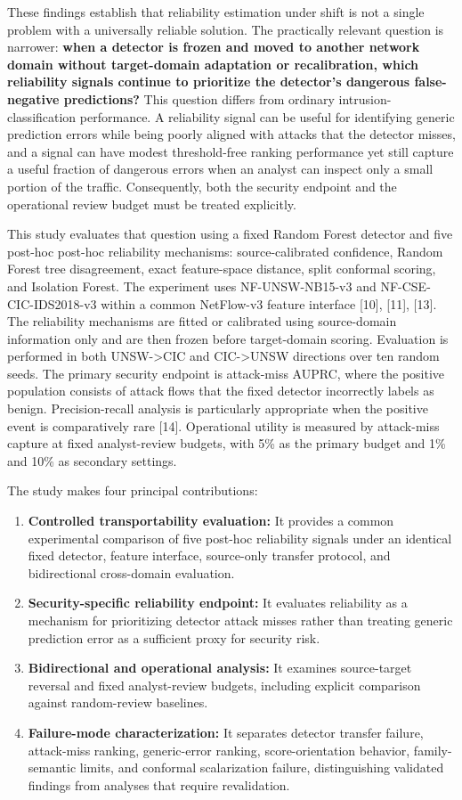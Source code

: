 \documentclass[conference]{IEEEtran}
\begin{document}
These findings establish that reliability estimation under shift is not a single problem with a universally reliable solution. The practically relevant question is narrower: \textbf{when a detector is frozen and moved to another network domain without target-domain adaptation or recalibration, which reliability signals continue to prioritize the detector's dangerous false-negative predictions?} This question differs from ordinary intrusion-classification performance. A reliability signal can be useful for identifying generic prediction errors while being poorly aligned with attacks that the detector misses, and a signal can have modest threshold-free ranking performance yet still capture a useful fraction of dangerous errors when an analyst can inspect only a small portion of the traffic. Consequently, both the security endpoint and the operational review budget must be treated explicitly.

This study evaluates that question using a fixed Random Forest detector and five post-hoc post-hoc reliability mechanisms: source-calibrated confidence, Random Forest tree disagreement, exact feature-space distance, split conformal scoring, and Isolation Forest. The experiment uses NF-UNSW-NB15-v3 and NF-CSE-CIC-IDS2018-v3 within a common NetFlow-v3 feature interface [10], [11], [13]. The reliability mechanisms are fitted or calibrated using source-domain information only and are then frozen before target-domain scoring. Evaluation is performed in both UNSW->CIC and CIC->UNSW directions over ten random seeds. The primary security endpoint is attack-miss AUPRC, where the positive population consists of attack flows that the fixed detector incorrectly labels as benign. Precision-recall analysis is particularly appropriate when the positive event is comparatively rare [14]. Operational utility is measured by attack-miss capture at fixed analyst-review budgets, with 5\% as the primary budget and 1\% and 10\% as secondary settings.

The study makes four principal contributions:

\begin{enumerate}
\item \textbf{Controlled transportability evaluation:} It provides a common experimental comparison of five post-hoc reliability signals under an identical fixed detector, feature interface, source-only transfer protocol, and bidirectional cross-domain evaluation.
\item \textbf{Security-specific reliability endpoint:} It evaluates reliability as a mechanism for prioritizing detector attack misses rather than treating generic prediction error as a sufficient proxy for security risk.
\item \textbf{Bidirectional and operational analysis:} It examines source-target reversal and fixed analyst-review budgets, including explicit comparison against random-review baselines.
\item \textbf{Failure-mode characterization:} It separates detector transfer failure, attack-miss ranking, generic-error ranking, score-orientation behavior, family-semantic limits, and conformal scalarization failure, distinguishing validated findings from analyses that require revalidation.
\end{enumerate}
\end{document}
